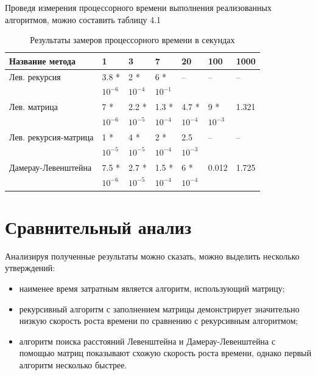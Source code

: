 \documentclass[12pt,a4paper]{report}
\begin{document}
Проведя измерения процессорного времени выполнения реализованных алгоритмов, можно составить таблицу 4.1

\begin{table}
\caption{Результаты замеров процессорного времени в секундах}
\label{tabular:timesandtenses}
\begin{center}
\begin{tabular}{ | l | l | l | l | l | l | l |}
\hline
Название метода       & 1         & 3         & 7         & 20        & 100       & 1000  \\ \hline
Лев. рекурсия         & 3.8 *     & 2 *       & 6 *       & --        & --        & --    \\ 
                      & $10^{-6}$ & $10^{-4}$ & $10^{-1}$ &           &           &       \\ \hline
Лев. матрица          & 7 *       & 2.2 *     & 1.3 *     & 4.7 *     & 9 *       & 1.321 \\
                      & $10^{-6}$ & $10^{-5}$ & $10^{-4}$ & $10^{-4}$ & $10^{-3}$ &       \\ \hline
Лев. рекурсия-матрица & 1 *       & 4 *       & 2 *       & 2.5       & --        & --    \\
                      & $10^{-5}$ & $10^{-5}$ & $10^{-4}$ & $10^{-3}$ &           &       \\ \hline
Дамерау-Левенштейна   & 7.5 *     & 2.7 *     & 1.5 *     & 6 *       & 0.012     & 1.725 \\
                      & $10^{-6}$ & $10^{-5}$ & $10^{-4}$ & $10^{-4}$ &           &       \\ 
\hline
\end{tabular}
\end{center}
\end{table}

\section{Сравнительный анализ}

Анализируя полученные результаты можно сказать, можно выделить несколько утверждений:

\begin{itemize}
    \item наименее время затратным является алгоритм, использующий матрицу;
    \item рекурсивный алгоритм с заполнением матрицы демонстрирует значительно низкую скорость роста времени по сравнению с рекурсивным алгоритмом;
    \item алгоритм поиска расстояний Левенштейна и Дамерау-Левенштейна с помощью матриц показывают схожую скорость роста времени, однако первый алгоритм несколько быстрее.
\end{itemize}
\end{document}

